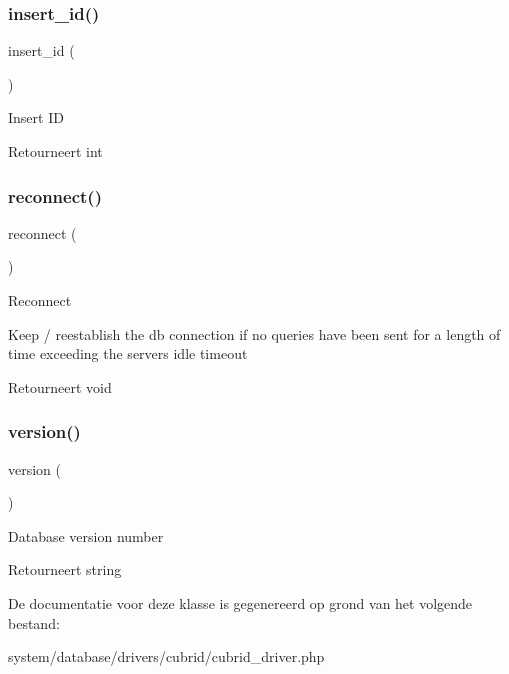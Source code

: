 \subsubsection{\texorpdfstring{insert\_id()}{insert\_id()}}
{\footnotesize\ttfamily insert\+\_\+id (\begin{DoxyParamCaption}{ }\end{DoxyParamCaption})}

Insert ID

\begin{DoxyReturn}{Retourneert}
int 
\end{DoxyReturn}
\mbox{\label{class_c_i___d_b__cubrid__driver_a57c19c642ab3023e28d10c50f86ff0a8}} 
\subsubsection{\texorpdfstring{reconnect()}{reconnect()}}
{\footnotesize\ttfamily reconnect (\begin{DoxyParamCaption}{ }\end{DoxyParamCaption})}

Reconnect

Keep / reestablish the db connection if no queries have been sent for a length of time exceeding the server\textquotesingle{}s idle timeout

\begin{DoxyReturn}{Retourneert}
void 
\end{DoxyReturn}
\mbox{\label{class_c_i___d_b__cubrid__driver_a6080dae0886626b9a4cedb29240708b1}} 
\subsubsection{\texorpdfstring{version()}{version()}}
{\footnotesize\ttfamily version (\begin{DoxyParamCaption}{ }\end{DoxyParamCaption})}

Database version number

\begin{DoxyReturn}{Retourneert}
string 
\end{DoxyReturn}


De documentatie voor deze klasse is gegenereerd op grond van het volgende bestand\+:\begin{DoxyCompactItemize}
\item 
system/database/drivers/cubrid/cubrid\+\_\+driver.\+php\end{DoxyCompactItemize}
